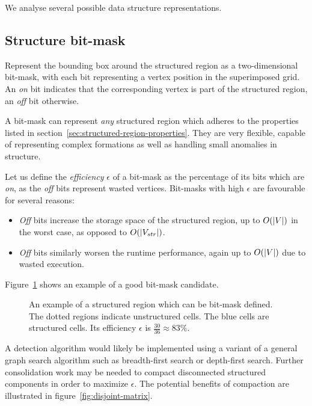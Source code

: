 We analyse several possible data structure representations.

\subsection{Structure bit-mask}
\label{subsec:structure-bitmap}

\newcommand{\drawbitmap}[2]{
	
}

Represent the bounding box around the structured region as a two-dimensional bit-mask, with each bit representing a vertex position in the superimposed grid. An \emph{on} bit indicates that the corresponding vertex is part of the structured region, an \emph{off} bit otherwise.

A bit-mask can represent \emph{any} structured region which adheres to the properties listed in section~\ref{sec:structured-region-properties}. They are very flexible, capable of representing complex formations as well as handling small anomalies in structure.

Let us define the \emph{efficiency} $\epsilon$ of a bit-mask as the percentage of its bits which are \emph{on}, as the \emph{off} bits represent wasted vertices. Bit-masks with high $\epsilon$ are favourable for several reasons:
\begin{itemize}
\item \emph{Off} bits increase the storage space of the structured region, up to $O(\left\vert{V}\right\vert)$ in the worst case, as opposed to $O(\left\vert{V_{str}}\right\vert)$.
\item \emph{Off} bits similarly worsen the runtime performance, again up to $O(\left\vert{V}\right\vert)$ due to wasted execution.
\end{itemize}

Figure~\ref{fig:example-bitmask} shows an example of a good bit-mask candidate.

\begin{figure}
\drawmatrix[cell wd=0.8, cell ht=0.8]{\bitmapmatrix}
\caption{An example of a structured region which can be bit-mask defined. The dotted regions indicate unstructured cells. The blue cells are structured cells. Its efficiency $\epsilon$ is $\frac{30}{36} \approx 83\%$.}
\label{fig:example-bitmask}
\end{figure}

A detection algorithm would likely be implemented using a variant of a general graph search algorithm such as breadth-first search or depth-first search. Further consolidation work may be needed to compact disconnected structured components in order to maximize $\epsilon$. The potential benefits of compaction are illustrated in figure~\ref{fig:disjoint-matrix}.

